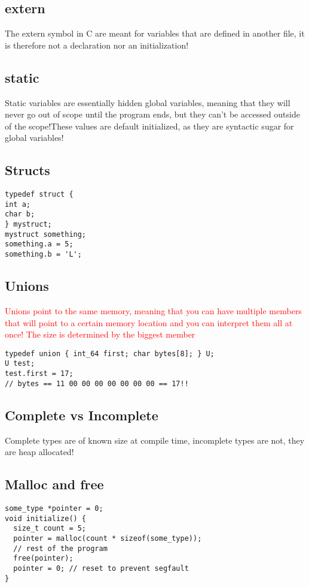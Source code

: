 \documentclass[main.tex,fontsize=7pt,paper=a4,paper=landscape,DIV=calc,]{scrartcl}
\begin{document}
\begin{multicols*}{4}
\subsection{extern}
The extern symbol in C are meant for variables that are defined in another file, it is therefore not a declaration nor an initialization!

\subsection{static}
Static variables are essentially hidden global variables, meaning that they will never go out of scope until the program ends, but they can't be accessed outside of the scope!These values are default initialized, as they are syntactic sugar for global variables!

\subsection{Structs}
\vspace{-2.5mm}
\begin{lstlisting}
typedef struct {
int a;
char b;
} mystruct;
mystruct something;
something.a = 5;
something.b = 'L';
\end{lstlisting}
\vspace{2mm}

\subsection{Unions}
\textcolor{red}{Unions point to the same memory, meaning that you can have multiple members that will point to a certain memory location and you can interpret them all at once! The size is determined by the biggest member}
\vspace{-2.5mm}
\begin{lstlisting}
typedef union { int_64 first; char bytes[8]; } U;
U test;
test.first = 17;
// bytes == 11 00 00 00 00 00 00 00 == 17!!
\end{lstlisting}
\vspace{2mm}

\subsection{Complete vs Incomplete}
Complete types are of known size at compile time, incomplete types are not, they are heap allocated!

\subsection{Malloc and free}
\vspace{-2.5mm}
\begin{lstlisting}
some_type *pointer = 0;
void initialize() {
  size_t count = 5;
  pointer = malloc(count * sizeof(some_type));
  // rest of the program 
  free(pointer);
  pointer = 0; // reset to prevent segfault
}
\end{lstlisting}
\vspace{2mm}


\end{multicols*}
\end{document}
